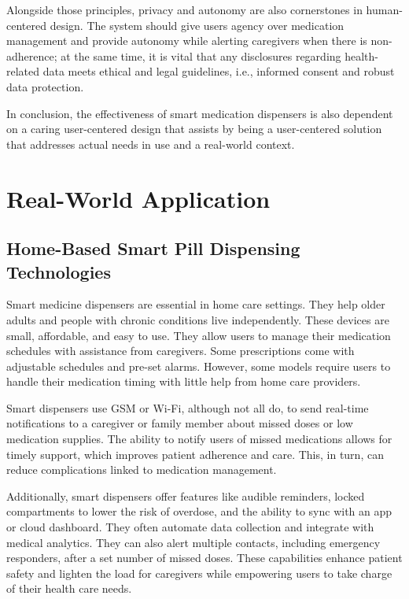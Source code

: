Alongside those principles, privacy and autonomy are also cornerstones in human-centered design. The system should give users agency over medication management and provide autonomy while alerting caregivers when there is non-adherence; at the same time, it is vital that any disclosures regarding health-related data meets ethical and legal guidelines, i.e., informed consent and robust data protection.

In conclusion, the effectiveness of smart medication dispensers is also dependent on a caring user-centered design that assists by being a user-centered solution that addresses actual needs in use and a real-world context.
\section{ Real-World Application}

\subsection{Home-Based Smart Pill Dispensing Technologies}
Smart medicine dispensers are essential in home care settings. They help older adults and people with chronic conditions live independently. These devices are small, affordable, and easy to use. They allow users to manage their medication schedules with assistance from caregivers. Some prescriptions come with adjustable schedules and pre-set alarms. However, some models require users to handle their medication timing with little help from home care providers.

Smart dispensers use GSM or Wi-Fi, although not all do, to send real-time notifications to a caregiver or family member about missed doses or low medication supplies. The ability to notify users of missed medications allows for timely support, which improves patient adherence and care. This, in turn, can reduce complications linked to medication management.

Additionally, smart dispensers offer features like audible reminders, locked compartments to lower the risk of overdose, and the ability to sync with an app or cloud dashboard. They often automate data collection and integrate with medical analytics. They can also alert multiple contacts, including emergency responders, after a set number of missed doses. These capabilities enhance patient safety and lighten the load for caregivers while empowering users to take charge of their health care needs.

